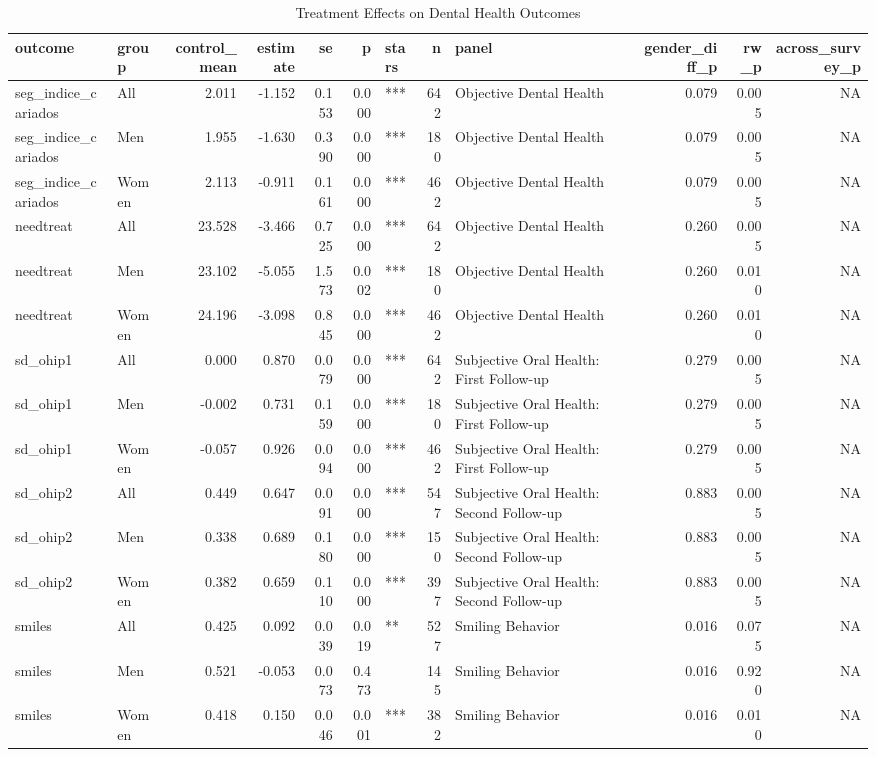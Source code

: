 \begin{table}

\caption{Treatment Effects on Dental Health Outcomes}
\centering
\begin{tabular}[t]{llrrrrlrlrrr}
\toprule
outcome & group & control\_mean & estimate & se & p & stars & n & panel & gender\_diff\_p & rw\_p & across\_survey\_p\\
\midrule
seg\_indice\_cariados & All & 2.011 & -1.152 & 0.153 & 0.000 & *** & 642 & Objective Dental Health & 0.079 & 0.005 & NA\\
seg\_indice\_cariados & Men & 1.955 & -1.630 & 0.390 & 0.000 & *** & 180 & Objective Dental Health & 0.079 & 0.005 & NA\\
seg\_indice\_cariados & Women & 2.113 & -0.911 & 0.161 & 0.000 & *** & 462 & Objective Dental Health & 0.079 & 0.005 & NA\\
needtreat & All & 23.528 & -3.466 & 0.725 & 0.000 & *** & 642 & Objective Dental Health & 0.260 & 0.005 & NA\\
needtreat & Men & 23.102 & -5.055 & 1.573 & 0.002 & *** & 180 & Objective Dental Health & 0.260 & 0.010 & NA\\
\addlinespace
needtreat & Women & 24.196 & -3.098 & 0.845 & 0.000 & *** & 462 & Objective Dental Health & 0.260 & 0.010 & NA\\
sd\_ohip1 & All & 0.000 & 0.870 & 0.079 & 0.000 & *** & 642 & Subjective Oral Health: First Follow-up & 0.279 & 0.005 & NA\\
sd\_ohip1 & Men & -0.002 & 0.731 & 0.159 & 0.000 & *** & 180 & Subjective Oral Health: First Follow-up & 0.279 & 0.005 & NA\\
sd\_ohip1 & Women & -0.057 & 0.926 & 0.094 & 0.000 & *** & 462 & Subjective Oral Health: First Follow-up & 0.279 & 0.005 & NA\\
sd\_ohip2 & All & 0.449 & 0.647 & 0.091 & 0.000 & *** & 547 & Subjective Oral Health: Second Follow-up & 0.883 & 0.005 & NA\\
\addlinespace
sd\_ohip2 & Men & 0.338 & 0.689 & 0.180 & 0.000 & *** & 150 & Subjective Oral Health: Second Follow-up & 0.883 & 0.005 & NA\\
sd\_ohip2 & Women & 0.382 & 0.659 & 0.110 & 0.000 & *** & 397 & Subjective Oral Health: Second Follow-up & 0.883 & 0.005 & NA\\
smiles & All & 0.425 & 0.092 & 0.039 & 0.019 & ** & 527 & Smiling Behavior & 0.016 & 0.075 & NA\\
smiles & Men & 0.521 & -0.053 & 0.073 & 0.473 &  & 145 & Smiling Behavior & 0.016 & 0.920 & NA\\
smiles & Women & 0.418 & 0.150 & 0.046 & 0.001 & *** & 382 & Smiling Behavior & 0.016 & 0.010 & NA\\
\bottomrule
\end{tabular}
\end{table}

